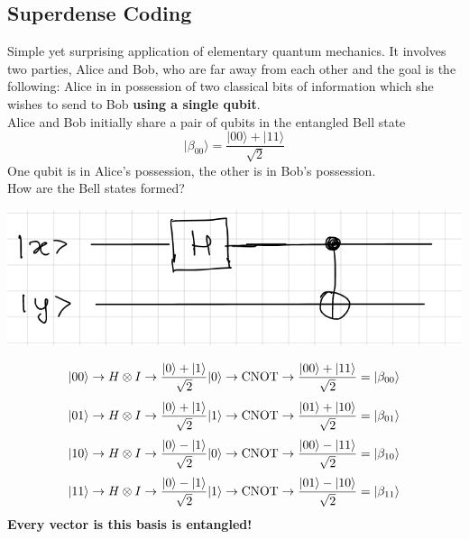 \documentclass[10pt]{report}
\begin{document}
\subsection{Superdense Coding}
Simple yet surprising application of elementary quantum mechanics. It involves two parties, Alice and Bob, who are far away from each other and the goal is the following: Alice in in possession of two classical bits of information which she wishes to send to Bob \textbf{using a single qubit}.\\
Alice and Bob initially share a pair of qubits in the entangled Bell state $$|\beta_{00}\rangle = \frac{|00\rangle + |11\rangle}{\sqrt{2}}$$
One qubit is in Alice's possession, the other is in Bob's possession.\\
How are the Bell states formed?
\begin{center}
	\includegraphics[scale=0.5]{15.png}
\end{center}
$$|00\rangle \rightarrow H\otimes I\rightarrow \frac{|0\rangle+|1\rangle}{\sqrt{2}}|0\rangle\rightarrow\hbox{CNOT}\rightarrow\frac{|00\rangle+|11\rangle}{\sqrt{2}} = |\beta_{00}\rangle$$
$$|01\rangle \rightarrow H\otimes I\rightarrow \frac{|0\rangle+|1\rangle}{\sqrt{2}}|1\rangle\rightarrow\hbox{CNOT}\rightarrow\frac{|01\rangle+|10\rangle}{\sqrt{2}} = |\beta_{01}\rangle$$
$$|10\rangle \rightarrow H\otimes I\rightarrow \frac{|0\rangle-|1\rangle}{\sqrt{2}}|0\rangle\rightarrow\hbox{CNOT}\rightarrow\frac{|00\rangle-|11\rangle}{\sqrt{2}} = |\beta_{10}\rangle$$
$$|11\rangle \rightarrow H\otimes I\rightarrow \frac{|0\rangle-|1\rangle}{\sqrt{2}}|1\rangle\rightarrow\hbox{CNOT}\rightarrow\frac{|01\rangle-|10\rangle}{\sqrt{2}} = |\beta_{11}\rangle$$
\textbf{Every vector is this basis is entangled!}
\end{document}
